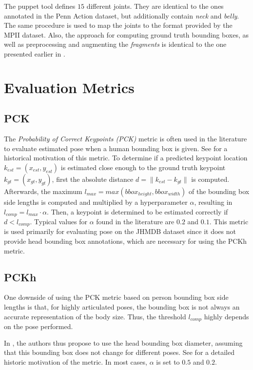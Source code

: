 The puppet tool defines $15$ different joints.
They are identical to the ones annotated in the Penn Action dataset, but additionally contain \textit{neck} and \textit{belly}.
The same procedure is used to map the joints to the format provided by the MPII dataset.
Also, the approach for computing ground truth bounding boxes, as well as preprocessing and augmenting the \textit{fragments} is identical to the one presented earlier in .

\section{Evaluation Metrics}
\label{sec:exp-metrics}
\subsection{PCK}
\label{sec:exp-pck}

The \textit{Probability of Correct Keypoints (PCK)} metric \cite{ferrari_progressive_2008} is often used in the literature to evaluate estimated pose when a human bounding box is given.
See  for a historical motivation of this metric.
To determine if a predicted keypoint location $k_{est} = (x_{est}, y_{est})$ is estimated close enough to the ground truth keypoint $k_{gt} = (x_{gt}, y_{gt})$, first the absolute distance $d = \lVert k_{est} - k_{gt} \rVert$ is computed.
Afterwards, the maximum $l_{max} = max(bbox_{height}, bbox_{width})$ of the bounding box side lengths is computed and multiplied by a hyperparameter $\alpha$, resulting in $l_{comp} = l_{max} \cdot \alpha$.
Then, a keypoint is determined to be estimated correctly if $d < l_{comp}$.
Typical values for $\alpha$ found in the literature are $0.2$ and $0.1$.
This metric is used primarily for evaluating pose on the JHMDB dataset since it does not provide head bounding box annotations, which are necessary for using the PCKh metric.

\subsection{PCKh}
\label{sec:exp-pckh}
One downside of using the PCK metric based on person bounding box side lengths is that, for highly articulated poses, the bounding box is not always an accurate representation of the body size.
Thus, the threshold $l_{comp}$ highly depends on the pose performed.

In \cite{andriluka_2d_2014}, the authors thus propose to use the head bounding box diameter, assuming that this bounding box does not change for different poses.
See  for a detailed historic motivation of the metric.
In most cases, $\alpha$ is set to $0.5$ and $0.2$.

